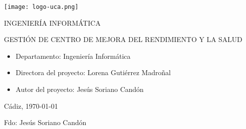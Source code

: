 


\begin{center}

  \texttt{[image: logo-uca.png]} \\

  \vspace{2.5cm}


  \vspace{1.0cm}

  \large{INGENIERÍA INFORMÁTICA} \\

  \vspace{2.0cm}

  \large{GESTIÓN DE CENTRO DE MEJORA DEL RENDIMIENTO Y LA SALUD} \\

  \vspace{2.5cm}

\end{center}

\begin{itemize}
\item \large{Departamento: Ingeniería Informática}
\item \large{Directora del proyecto: Lorena Gutiérrez Madroñal}
\item \large{Autor del proyecto: Jesús Soriano Candón}
\end{itemize}

\vspace{0.2cm}

\begin{flushright}
  \large{Cádiz, \today} \\

  \vspace{2.5cm}

  \large{Fdo: Jesús Soriano Candón}
\end{flushright}
